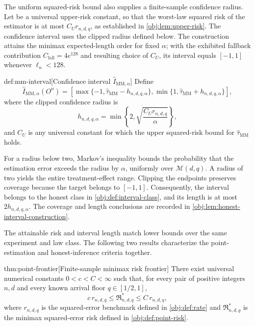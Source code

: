 \documentclass[11pt]{article}
\begin{document}
The uniform squared-risk bound also supplies a finite-sample confidence radius. Let  be a universal upper-risk constant, so that the worst-law squared risk of the estimator is at most \(C_Ur_{n,d,q}\), as established in \cref{obj:lem:upper-risk}. The confidence interval  uses the clipped radius  defined below. The construction attains the minimax expected-length order for fixed \(\alpha\); with the exhibited fallback contribution \(C_{\mathrm{fall}}=4e^{128}\) and resulting choice of \(C_U\), its interval equals \([-1,1]\) whenever \(\ell_n<128\).

\begin{definitionv}{def:mm-interval}[Confidence interval $\widehat I_{\mathrm{MM},\alpha}$]
Define
\[
\widehat I_{\mathrm{MM},\alpha}(O^n)
=
\left[
\max\{-1,\widehat\tau_{\mathrm{MM}}-h_{n,d,q,\alpha}\},
\min\{1,\widehat\tau_{\mathrm{MM}}+h_{n,d,q,\alpha}\}
\right],
\]
where the clipped confidence radius is
\[
h_{n,d,q,\alpha}
=\min\left\{2,\sqrt{\frac{C_Ur_{n,d,q}}{\alpha}}\right\},
\]
and \(C_U\) is any universal constant for which the upper squared-risk bound for \(\widehat\tau_{\mathrm{MM}}\) holds.
\end{definitionv}

For a radius below two, Markov's inequality bounds the probability that the estimation error exceeds the radius by \(\alpha\), uniformly over \(\mathcal M(d,q)\). A radius of two yields the entire treatment-effect range. Clipping the endpoints preserves coverage because the target belongs to \([-1,1]\). Consequently, the interval belongs to the honest class in \cref{obj:def:interval-class}, and its length is at most \(2h_{n,d,q,\alpha}\). The coverage and length conclusions are recorded in \cref{obj:lem:honest-interval-construction}.

The attainable risk and interval length match lower bounds over the same experiment and law class. The following two results characterize the point-estimation and honest-inference criteria together.

\begin{theoremv}{thm:point-frontier}[Finite-sample minimax risk frontier]
There exist universal numerical constants \(0<c<C<\infty\) such that, for every pair of positive integers \(n,d\) and every known arrival floor \(q\in[1/2,1]\),
\[
c\,r_{n,d,q}\le \mathfrak R^*_{n,d,q}\le C\,r_{n,d,q},
\]
where \(r_{n,d,q}\) is the squared-error benchmark defined in \cref{obj:def:rate} and \(\mathfrak R^*_{n,d,q}\) is the minimax squared-error risk defined in \cref{obj:def:point-risk}.
\end{theoremv}
\end{document}
